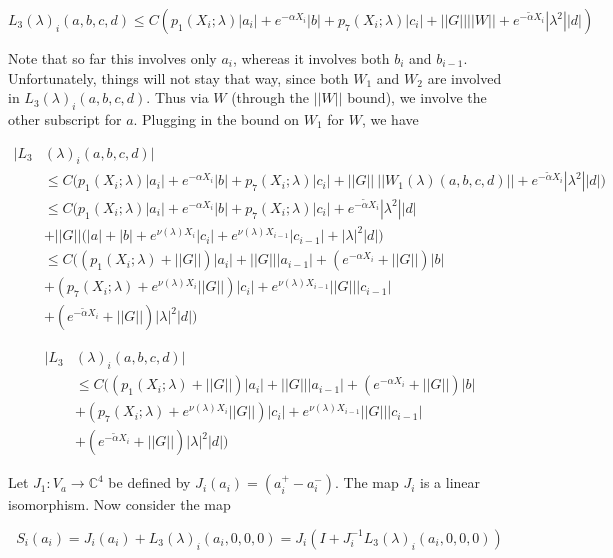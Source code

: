 \documentclass[12pt]{article}
\def\C{{\mathbb C}}
\begin{document}
\[
L_3(\lambda)_i(a, b, c, d) \leq C ( p_1(X_i; \lambda)|a_i|
+ e^{-\alpha X_i}|b| + p_7(X_i; \lambda)|c_i| + ||G|| ||W|| + e^{-\tilde{\alpha} X_i} |\lambda^2| |d| )
\]

Note that so far this involves only $a_i$, whereas it involves both $b_i$ and $b_{i-1}$. Unfortunately, things will not stay that way, since both $W_1$ and $W_2$ are involved in $L_3(\lambda)_i(a, b, c, d)$. Thus via $W$ (through the $||W||$ bound), we involve the other subscript for $a$. Plugging in the bound on $W_1$ for $W$, we have

\begin{align*}
|L_3&(\lambda)_i(a, b, c, d)| \\
&\leq C \Big( p_1(X_i; \lambda)|a_i|
+ e^{-\alpha X_i}|b| + p_7(X_i; \lambda)|c_i| + ||G||\:||W_1(\lambda)(a,b,c,d)|| + e^{-\tilde{\alpha} X_i} |\lambda^2| |d| \Big) \\
& \leq C \Big( p_1(X_i; \lambda)|a_i|
+ e^{-\alpha X_i}|b| + p_7(X_i; \lambda)|c_i| + e^{-\tilde{\alpha} X_i} |\lambda^2| |d| \\
&+ ||G|| (|a| + |b| + e^{\nu(\lambda)X_i}|c_i| + e^{\nu(\lambda)X_{i-1}}|c_{i-1}| + |\lambda|^2 |d| \Big) \\
& \leq C \Big( (p_1(X_i; \lambda) + ||G||)|a_i| + ||G|||a_{i-1}| + (e^{-\alpha X_i} + ||G||) |b| \\
&+ ( p_7(X_i; \lambda) + e^{\nu(\lambda)X_i} ||G||) |c_i| + e^{\nu(\lambda)X_{i-1}} ||G|| |c_{i-1}| \\
&+ (e^{-\tilde{\alpha} X_i} + ||G||) |\lambda|^2 |d| \Big)
\end{align*} 



\begin{align*}
|L_3&(\lambda)_i(a, b, c, d)| \\
&\leq C \Big( (p_1(X_i; \lambda) + ||G||)|a_i| + ||G|||a_{i-1}| + (e^{-\alpha X_i} + ||G||) |b| \\
&+ ( p_7(X_i; \lambda) + e^{\nu(\lambda)X_i} ||G||) |c_i| + e^{\nu(\lambda)X_{i-1}} ||G|| |c_{i-1}| \\
&+ (e^{-\tilde{\alpha} X_i} + ||G||) |\lambda|^2 |d| \Big)
\end{align*} 

Let $J_1: V_a \rightarrow \C^4$ be defined by $J_i(a_i) = (a_i^+ - a_i^-)$. The map $J_i$ is a linear isomorphism. Now consider the map

\[
S_i(a_i) = J_i (a_i) + L_3(\lambda)_i(a_i, 0, 0, 0) = J_i( I + J_i^{-1} L_3(\lambda)_i(a_i, 0, 0, 0))
\]
\end{document}
